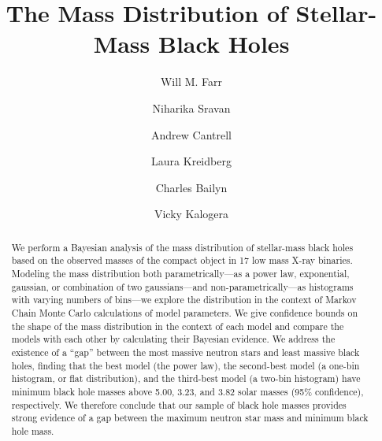 \documentclass[preprint]{aastex}
\begin{document}
\title{The Mass Distribution of Stellar-Mass Black Holes}

\author{Will M. Farr \and Niharika Sravan} 

\author{Andrew Cantrell \and Laura Kreidberg \and Charles Bailyn}



\author{Vicky Kalogera}  

\begin{abstract}
  We perform a Bayesian analysis of the mass distribution of
  stellar-mass black holes based on the observed masses of the compact
  object in 17 low mass X-ray binaries.  Modeling the mass
  distribution both parametrically---as a power law, exponential,
  gaussian, or combination of two gaussians---and
  non-parametrically---as histograms with varying numbers of
  bins---we explore the distribution in the context of Markov Chain
  Monte Carlo calculations of model parameters.  We give confidence
  bounds on the shape of the mass distribution in the context of each
  model and compare the models with each other by calculating their
  Bayesian evidence.  We address the existence of a ``gap'' between
  the most massive neutron stars and least massive black holes,
  finding that the best model (the power law), the second-best model
  (a one-bin histogram, or flat distribution), and the third-best
  model (a two-bin histogram) have minimum black hole masses above
  5.00, 3.23, and 3.82 solar masses (95\% confidence), respectively.
  We therefore conclude that our sample of black hole masses provides
  strong evidence of a gap between the maximum neutron star mass and
  minimum black hole mass.
\end{abstract}

\maketitle
\end{document}
